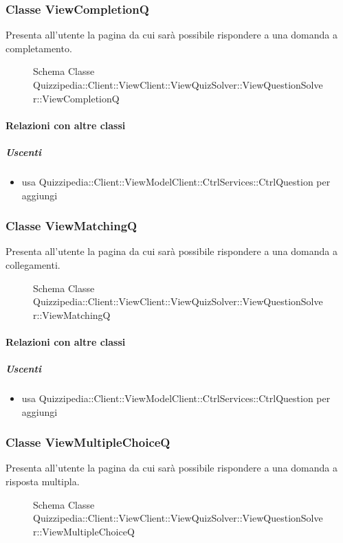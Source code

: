 \subsubsection{Classe ViewCompletionQ}
Presenta all'utente la pagina da cui sarà possibile rispondere a una domanda a completamento.
\begin{figure}[H]
\centering
\noindent{}
\caption[Schema Classe ViewCompletionQ]{Schema Classe Quizzipedia::Client::ViewClient::ViewQuizSolver::ViewQuestionSolver::ViewCompletionQ}
\end{figure}
\paragraph{Relazioni con altre classi}
\subparagraph{Uscenti}
\begin{itemize}
\item usa Quizzipedia::Client::ViewModelClient::CtrlServices::CtrlQuestion per aggiungi
\end{itemize}
\subsubsection{Classe ViewMatchingQ}
Presenta all'utente la pagina da cui sarà possibile rispondere a una domanda a collegamenti.
\begin{figure}[H]
\centering
\noindent{}
\caption[Schema Classe ViewMatchingQ]{Schema Classe Quizzipedia::Client::ViewClient::ViewQuizSolver::ViewQuestionSolver::ViewMatchingQ}
\end{figure}
\paragraph{Relazioni con altre classi}
\subparagraph{Uscenti}
\begin{itemize}
\item usa Quizzipedia::Client::ViewModelClient::CtrlServices::CtrlQuestion per aggiungi
\end{itemize}
\subsubsection{Classe ViewMultipleChoiceQ}
Presenta all'utente la pagina da cui sarà possibile rispondere a una domanda a risposta multipla.
\begin{figure}[H]
\centering
\noindent{}
\caption[Schema Classe ViewMultipleChoiceQ]{Schema Classe Quizzipedia::Client::ViewClient::ViewQuizSolver::ViewQuestionSolver::ViewMultipleChoiceQ}
\end{figure}
